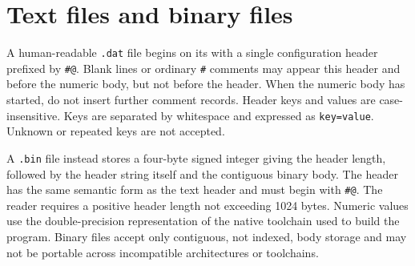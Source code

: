 \section{Text files and binary files}
A human-readable \texttt{.dat} file begins on its  with a single configuration header prefixed by \texttt{\#@}. Blank lines or ordinary \texttt{\#} comments may appear  this header and before the numeric body, but not before the header. When the numeric body has started, do not insert further comment records. Header keys and values are case-insensitive. Keys are separated by whitespace and expressed as \texttt{key=value}. Unknown or repeated keys are not accepted.

A \texttt{.bin} file instead stores a four-byte signed integer giving the header length, followed by the header string itself and the contiguous binary body. The header has the same semantic form as the text header and must begin with \texttt{\#@}. The reader requires a positive header length not exceeding 1024 bytes. Numeric values use the double-precision representation of the native toolchain used to build the program. Binary files accept only contiguous, not indexed, body storage and may not be portable across incompatible architectures or toolchains.

